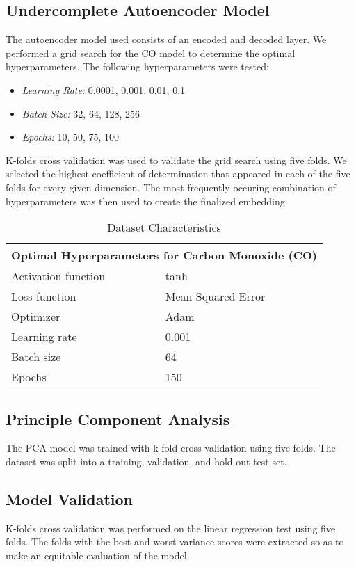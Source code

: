 \documentclass{article}
\begin{document}
\subsection{Undercomplete Autoencoder Model}
The autoencoder model used consists of an encoded and decoded layer. We performed
a grid search for the CO model to determine the optimal hyperparameters. The following 
hyperparameters were tested:
\begin{itemize}
    \item \textit{Learning Rate:} 0.0001, 0.001, 0.01, 0.1
    \item \textit{Batch Size:} 32, 64, 128, 256
    \item \textit{Epochs:} 10, 50, 75, 100
\end{itemize}
K-folds cross validation was used to validate the grid search using five folds. We selected the
highest coefficient of determination that appeared in each of the five folds for every given
dimension. The most frequently occuring combination of hyperparameters was then used to create
the finalized embedding.

\begin{table}[h!]
    \caption{Dataset Characteristics}
    \label{tab:table1}
    \vspace{0.1cm}
    \begin{tabular}{p{4cm}p{7cm}}
        \hline
        \multicolumn{2}{c}{Optimal Hyperparameters for Carbon Monoxide (CO)} \\
        \hline
        Activation function & tanh\\
        Loss function & Mean Squared Error  \\
        Optimizer & Adam \\
        Learning rate & 0.001 \\
        Batch size & 64 \\
        Epochs & 150 \\ 
        \hline
    \end{tabular}
\end{table}

\subsection{Principle Component Analysis}
The PCA model was trained with k-fold cross-validation using five folds. The dataset was
split into a training, validation, and hold-out test set.

\subsection{Model Validation}
K-folds cross validation was performed on the linear regression test using five folds. The folds
with the best and worst variance scores were extracted so as to make an equitable evaluation of
the model.
\end{document}
